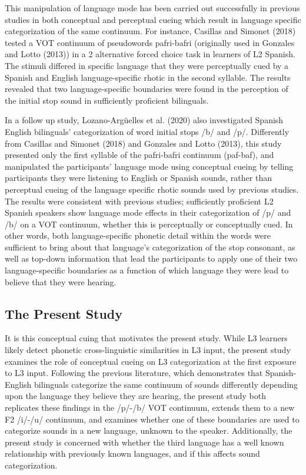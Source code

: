 \documentclass[
  english,
  man]{apa6}
\begin{document}
This manipulation of language mode has been carried out successfully in previous studies in both conceptual and perceptual cueing which result in language specific categorization of the same continuum.
For instance, Casillas and Simonet (2018) tested a VOT continuum of pseudowords pafri-bafri (originally used in Gonzales and Lotto (2013)) in a 2 alternative forced choice task in learners of L2 Spanish.
The stimuli differed in specific language that they were perceptually cued by a Spanish and English language-specific rhotic in the second syllable.
The results revealed that two language-specific boundaries were found in the perception of the initial stop sound in sufficiently proficient bilinguals.

In a follow up study, Lozano-Argüelles et al. (2020) also investigated Spanish English bilinguals' categorization of word initial stops /b/ and /p/.
Differently from Casillas and Simonet (2018) and Gonzales and Lotto (2013), this study presented only the first syllable of the pafri-bafri continuum (paf-baf), and manipulated the participants' language mode using conceptual cueing by telling participants they were listening to English or Spanish sounds, rather than perceptual cueing of the language specific rhotic sounds used by previous studies.
The results were consistent with previous studies; sufficiently proficient L2 Spanish speakers show language mode effects in their categorization of /p/ and /b/ on a VOT continuum, whether this is perceptually or conceptually cued.
In other words, both language-specific phonetic detail within the words were sufficient to bring about that language's categorization of the stop consonant, as well as top-down information that lead the participants to apply one of their two language-specific boundaries as a function of which language they were lead to believe that they were hearing.

\hypertarget{the-present-study}{%
\subsection{The Present Study}\label{the-present-study}}

It is this conceptual cuing that motivates the present study.
While L3 learners likely detect phonetic cross-linguistic similarities in L3 input, the present study examines the role of conceptual cueing on L3 categorization at the first exposure to L3 input.
Following the previous literature, which demonstrates that Spanish-English bilinguals categorize the same continuum of sounds differently depending upon the language they believe they are hearing, the present study both replicates these findings in the /p/-/b/ VOT continuum, extends them to a new F2 /i/-/u/ continuum, and examines whether one of these boundaries are used to categorize sounds in a new language, unknown to the speaker.
Additionally, the present study is concerned with whether the third language has a well known relationship with previously known languages, and if this affects sound categorization.
\end{document}
